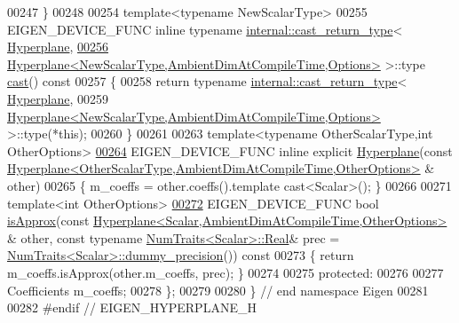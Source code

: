 \begin{DoxyCode}
00247   \}
00248 
00254   \textcolor{keyword}{template}<\textcolor{keyword}{typename} NewScalarType>
00255   EIGEN\_DEVICE\_FUNC \textcolor{keyword}{inline} \textcolor{keyword}{typename} \hyperlink{struct_eigen_1_1internal_1_1cast__return__type}{internal::cast\_return\_type}<
      \hyperlink{group___geometry___module_a98d2a770332eec864a897a8ef5bb6025}{Hyperplane},
\hyperlink{group___geometry___module_aa3b0071864745e33f3a7b75bb308bd46}{00256}            \hyperlink{group___geometry___module_class_eigen_1_1_hyperplane}{Hyperplane<NewScalarType,AmbientDimAtCompileTime,Options>}
       >::type \hyperlink{group___geometry___module_aa3b0071864745e33f3a7b75bb308bd46}{cast}()\textcolor{keyword}{ const}
00257 \textcolor{keyword}{  }\{
00258     \textcolor{keywordflow}{return} \textcolor{keyword}{typename} \hyperlink{struct_eigen_1_1internal_1_1cast__return__type}{internal::cast\_return\_type}<
      \hyperlink{group___geometry___module_a98d2a770332eec864a897a8ef5bb6025}{Hyperplane},
00259                     \hyperlink{group___geometry___module_class_eigen_1_1_hyperplane}{Hyperplane<NewScalarType,AmbientDimAtCompileTime,Options>}
       >::type(*\textcolor{keyword}{this});
00260   \}
00261 
00263   \textcolor{keyword}{template}<\textcolor{keyword}{typename} OtherScalarType,\textcolor{keywordtype}{int} OtherOptions>
\hyperlink{group___geometry___module_ad4c2c28d6a4c74218c788094ed072264}{00264}   EIGEN\_DEVICE\_FUNC \textcolor{keyword}{inline} \textcolor{keyword}{explicit} \hyperlink{group___geometry___module_ad4c2c28d6a4c74218c788094ed072264}{Hyperplane}(\textcolor{keyword}{const} 
      \hyperlink{group___geometry___module_class_eigen_1_1_hyperplane}{Hyperplane<OtherScalarType,AmbientDimAtCompileTime,OtherOptions>}
      & other)
00265   \{ m\_coeffs = other.coeffs().template cast<Scalar>(); \}
00266 
00271   \textcolor{keyword}{template}<\textcolor{keywordtype}{int} OtherOptions>
\hyperlink{group___geometry___module_a544f8466e85e4b95e1848dccf6015d23}{00272}   EIGEN\_DEVICE\_FUNC \textcolor{keywordtype}{bool} \hyperlink{group___geometry___module_a544f8466e85e4b95e1848dccf6015d23}{isApprox}(\textcolor{keyword}{const} 
      \hyperlink{group___geometry___module_class_eigen_1_1_hyperplane}{Hyperplane<Scalar,AmbientDimAtCompileTime,OtherOptions>}
      & other, \textcolor{keyword}{const} \textcolor{keyword}{typename} \hyperlink{group___core___module_struct_eigen_1_1_num_traits}{NumTraits<Scalar>::Real}& prec = 
      \hyperlink{group___core___module_struct_eigen_1_1_num_traits}{NumTraits<Scalar>::dummy\_precision}())\textcolor{keyword}{ const}
00273 \textcolor{keyword}{  }\{ \textcolor{keywordflow}{return} m\_coeffs.isApprox(other.m\_coeffs, prec); \}
00274 
00275 \textcolor{keyword}{protected}:
00276 
00277   Coefficients m\_coeffs;
00278 \};
00279 
00280 \} \textcolor{comment}{// end namespace Eigen}
00281 
00282 \textcolor{preprocessor}{#endif // EIGEN\_HYPERPLANE\_H}
\end{DoxyCode}
